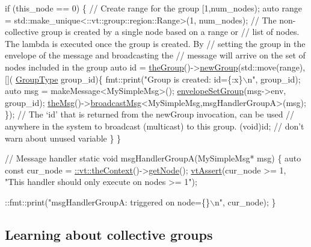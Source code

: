 \begin{DoxyCodeInclude}
  \textcolor{keywordflow}{if} (this\_node == 0) \{
    \textcolor{comment}{// Create range for the group [1,num\_nodes);}
    \textcolor{keyword}{auto} range = std::make\_unique<::vt::group::region::Range>(1, num\_nodes);
    \textcolor{comment}{// The non-collective group is created by a single node based on a range or}
    \textcolor{comment}{// list of nodes. The lambda is executed once the group is created. By}
    \textcolor{comment}{// setting the group in the envelope of the message and broadcasting the}
    \textcolor{comment}{// message will arrive on the set of nodes included in the group}
    \textcolor{keyword}{auto} \textcolor{keywordtype}{id} = \hyperlink{namespacevt_a4548473dce44fb654400009e2b2fe64e}{theGroup}()->\hyperlink{structvt_1_1group_1_1_group_manager_a076330445139abce77e1f6ab6e4358c5}{newGroup}(std::move(range), [](
      \hyperlink{namespacevt_a27b5e4411c9b6140c49100e050e2f743}{GroupType} group\_id)\{
      fmt::print(\textcolor{stringliteral}{"Group is created: id=\{:x\}\(\backslash\)n"}, group\_id);
      \textcolor{keyword}{auto} msg = makeMessage<MySimpleMsg>();
      \hyperlink{namespacevt_a9f9d4ce6034c0eaaf98bdffd33d0e1c7}{envelopeSetGroup}(msg->env, group\_id);
      \hyperlink{namespacevt_aeafd31f866aeb4dc6fc2f6ee97136350}{theMsg}()->\hyperlink{group__typesafehan_ga1a347aac6b6b8d47c9b1c8cc11b7f33e}{broadcastMsg}<MySimpleMsg,msgHandlerGroupA>(msg);
    \});
    \textcolor{comment}{// The `id' that is returned from the newGroup invocation, can be used}
    \textcolor{comment}{// anywhere in the system to broadcast (multicast) to this group.}
    (void)\textcolor{keywordtype}{id};  \textcolor{comment}{// don't warn about unused variable}
  \}
\}

\textcolor{comment}{// Message handler}
\textcolor{keyword}{static} \textcolor{keywordtype}{void} msgHandlerGroupA(MySimpleMsg* msg) \{
  \textcolor{keyword}{auto} \textcolor{keyword}{const} cur\_node = \hyperlink{namespacevt_a26551fe0e6e6a1371111df5b12c7e92c}{::vt::theContext}()->\hyperlink{structvt_1_1ctx_1_1_context_a0d52c263ce8516546a67443d9a86fa5f}{getNode}();
  \hyperlink{config__assert_8h_aeddd4990a496e91a0ca5d6c16437359b}{vtAssert}(cur\_node >= 1, \textcolor{stringliteral}{"This handler should only execute on nodes >= 1"});

  ::fmt::print(\textcolor{stringliteral}{"msgHandlerGroupA: triggered on node=\{\}\(\backslash\)n"}, cur\_node);
\}
\end{DoxyCodeInclude}
\hypertarget{tutorial-1f}{}\subsection{Learning about collective groups}\label{tutorial-1f}

